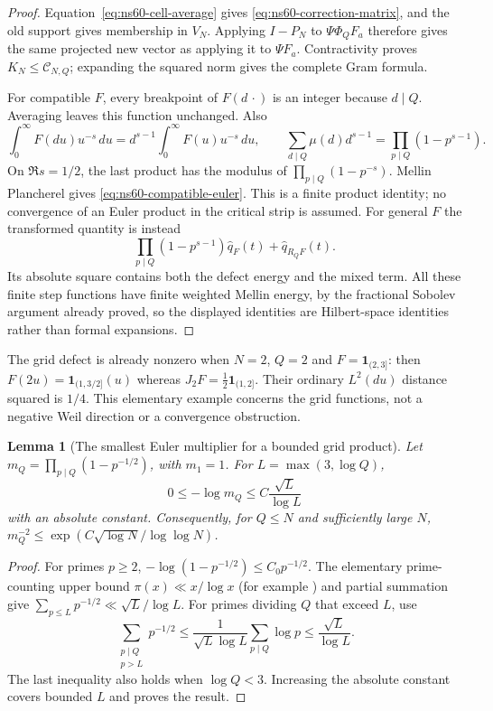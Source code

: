 \documentclass[11pt]{article}
\newtheorem{lemma}[theorem]{Lemma}
\theoremstyle{remark}
\begin{document}
\begin{proof}
Equation~\eqref{eq:ns60-cell-average} gives
\eqref{eq:ns60-correction-matrix}, and the old support gives membership
in $V_N$. Applying $I-P_N$ to $\Psi\Phi_QF_a$ therefore gives the
same projected new vector as applying it to $\Psi F_a$.
Contractivity proves $K_N\leq\mathcal C_{N,Q}$; expanding the squared
norm gives the complete Gram formula.

For compatible $F$, every breakpoint of $F(d\,\cdot)$ is an integer
because $d\mid Q$. Averaging leaves this function unchanged. Also
\[
 \int_0^\infty F(du)u^{-s}\,du
       =d^{s-1}\int_0^\infty F(u)u^{-s}\,du,
 \qquad
 \sum_{d\mid Q}\mu(d)d^{s-1}=\prod_{p\mid Q}(1-p^{s-1}).
\]
On $\Re s=1/2$, the last product has the modulus of
$\prod_{p\mid Q}(1-p^{-s})$. Mellin Plancherel gives
\eqref{eq:ns60-compatible-euler}. This is a finite product identity;
no convergence of an Euler product in the critical strip is assumed.
For general $F$ the transformed
quantity is instead
\[
 \prod_{p\mid Q}(1-p^{s-1})\widehat q_F(t)
                           +\widehat q_{R_QF}(t).
\]
Its absolute square contains both the defect energy and the mixed term.
All these finite step functions have finite weighted Mellin energy,
by the fractional Sobolev argument already proved, so the displayed
identities are Hilbert-space identities rather than formal expansions.
\end{proof}

The grid defect is already nonzero when $N=2$, $Q=2$ and
$F=\mathbf1_{(2,3]}$: then
$F(2u)=\mathbf1_{(1,3/2]}(u)$ whereas
$J_2F=\tfrac12\mathbf1_{(1,2]}$.
Their ordinary $L^2(du)$ distance squared is $1/4$.
This elementary example concerns the grid functions, not a negative
Weil direction or a convergence obstruction.

\begin{lemma}[The smallest Euler multiplier for a bounded grid product]
\label{lem:ns60-euler-minimum}
Let $m_Q=\prod_{p\mid Q}(1-p^{-1/2})$, with $m_1=1$.
For $L=\max(3,\log Q)$,
\begin{equation}
 0\leq-\log m_Q\leq C\frac{\sqrt L}{\log L}
 \label{eq:ns60-euler-minimum}
\end{equation}
with an absolute constant. Consequently, for $Q\leq N$ and sufficiently
large $N$,
$m_Q^{-2}\leq\exp(C\sqrt{\log N}/\log\log N)$.
\end{lemma}
\begin{proof}
For primes $p\geq2$,
$-\log(1-p^{-1/2})\leq C_0p^{-1/2}$.
The elementary prime-counting upper bound
$\pi(x)\ll x/\log x$ (for example
\cite[Corollary 1, Eq. (3.6)]{RosserSchoenfeld1962}) and partial
summation give $\sum_{p\leq L}p^{-1/2}\ll\sqrt L/\log L$.
For primes dividing $Q$ that exceed $L$, use
\[
 \sum_{\substack{p\mid Q\\p>L}}p^{-1/2}
 \leq\frac1{\sqrt L\log L}\sum_{p\mid Q}\log p
 \leq\frac{\sqrt L}{\log L}.
\]
The last inequality also holds when $\log Q<3$. Increasing the absolute
constant covers bounded $L$ and proves the result.
\end{proof}
\end{document}
